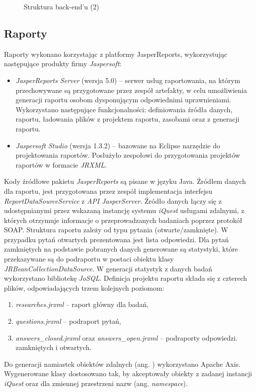 \newpage
\begin{figure}[H]
\begin{center}
 
\end{center}
\caption{Struktura back-end'u (2)}
\label{fig:back-end2}
\end{figure}
\newpage

\subsection{Raporty}
Raporty wykonano korzystając z platformy JasperReports, wykorzystując następujące produkty firmy \emph{Jaspersoft}:

\begin{itemize}
\item \emph{JasperReports Server} (wersja 5.0) -- serwer usług raportowania, na którym przechowywane są przygotowane przez zespół artefakty, w celu umożliwienia generacji raportu osobom dysponującym odpowiednimi uprawnieniami. Wykorzystano następujące funkcjonalności: definiowania źródła danych, raportu, ładowania plików z projektem raportu, zasobami oraz z generacji raportu.
\item \emph{Jaspersoft Studio} (wersja 1.3.2) -- bazowane na Eclipse narzędzie do projektowania raportów. Posłużyło zespołowi do przygotowania projektów raportów w formacie \emph{JRXML}.
\end{itemize}

Kody źródłowe pakietu \emph{JasperReports} są pisane w języku Java. Źródłem danych dla raportu, jest przygotowana przez zespół implementacja interfejsu \emph{ReportDataSourceService} z \emph{API JasperServer}. Źródło danych łączy się z udostępnianymi przez wskazaną instancję systemu \emph{iQuest} usługami zdalnymi, z których otrzymuje informacje o przeprowadzanych badaniach poprzez protokół SOAP. Struktura raportu zależy od typu pytania (otwarte/zamknięte). W przypadku pytań otwartych prezentowana jest lista odpowiedzi. Dla pytań zamkniętych na podstawie pobranych danych generowane są statystyki, które przekazywane są do podraportu w postaci obiektu klasy \emph{JRBeanCollectionDataSource}. W generacji statystyk z danych badań wykorzystano bibliotekę \emph{JoSQL}. Definicja projektu raportu składa się z czterech plików, odpowiadających trzem kolejnych poziomom:
\begin{enumerate}
\item \emph{researches.jrxml} -- raport główny dla badań,
\item \emph{questions.jrxml} -- podraport pytań,
\item \emph{answers\_closed.jrxml} oraz \emph{answers\_open.jrxml} -- podraporty odpowiedzi. zamkniętych i otwartych.
\end{enumerate}
Do generacji namiastek obiektów zdalnych (ang. ) wykorzystano Apache Axis. Wygenerowane klasy dostosowano tak, by akceptowały obiekty z zadanej instancji \emph{iQuest} oraz dla zmiennej przestrzeni nazw (ang. \emph{namespace}).\\

